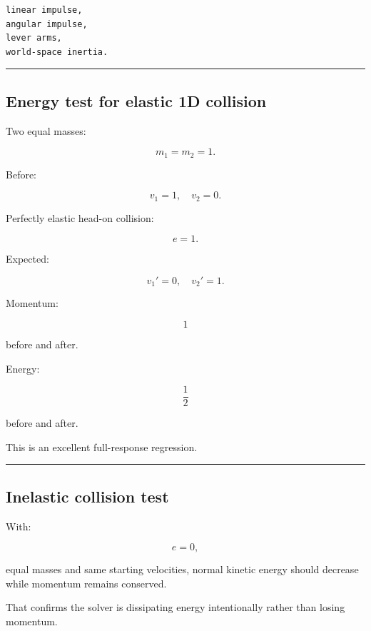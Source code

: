\begin{verbatim}
linear impulse,
angular impulse,
lever arms,
world-space inertia.
\end{verbatim}

\begin{center}\rule{0.5\linewidth}{0.5pt}\end{center}

\subsection{Energy test for elastic 1D collision}\label{06-engine-ii-ch039-energy-test-for-elastic-1d-collision}

\hypertarget{06-engine-ii-ch039-energy-test-for-elastic-1d-collision}{}

Two equal masses:

\[
m_1=m_2=1.
\]

Before:

\[
v_1=1,\quad v_2=0.
\]

Perfectly elastic head-on collision:

\[
e=1.
\]

Expected:

\[
v_1'=0,
\quad
v_2'=1.
\]

Momentum:

\[
1
\]

before and after.

Energy:

\[
\frac12
\]

before and after.

This is an excellent full-response regression.

\begin{center}\rule{0.5\linewidth}{0.5pt}\end{center}

\subsection{Inelastic collision test}\label{06-engine-ii-ch039-inelastic-collision-test}

\hypertarget{06-engine-ii-ch039-inelastic-collision-test}{}

With:

\[
e=0,
\]

equal masses and same starting velocities, normal kinetic energy should decrease while momentum remains conserved.

That confirms the solver is dissipating energy intentionally rather than losing momentum.

